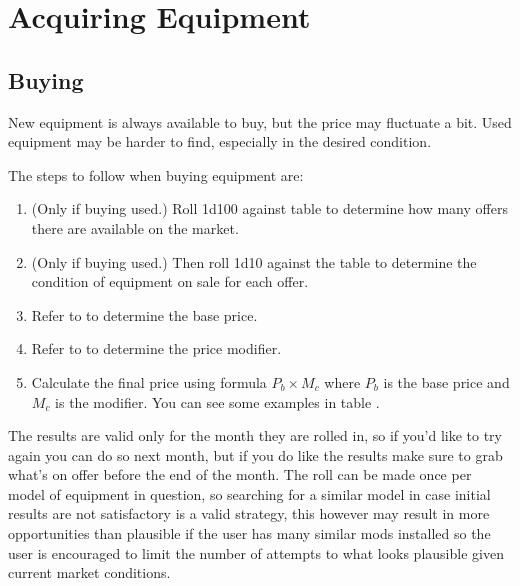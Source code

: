 \documentclass[a4paper,10pt]{article}
\begin{document}
\section{Acquiring Equipment}
\subsection{Buying}
New equipment is always available to buy, but the price may fluctuate a bit.
Used equipment may be harder to find, especially in the desired condition.

The steps to follow when buying equipment are:
\begin{enumerate}
\item (Only if buying used.) Roll 1d100 against table
   to determine how many offers there are
  available on the market.
\item (Only if buying used.) Then roll 1d10 against the table
   to determine the condition of
  equipment on sale for each offer.
\item Refer to  to determine the base price.
\item Refer to  to determine the price
  modifier.
\item Calculate the final price using formula $P_b \times M_c$ where $P_b$ is
  the base price and $M_c$ is the modifier. You can see some examples in table
  .
\end{enumerate}

The results are valid only for the month they are rolled in, so if you'd like to
try again you can do so next month, but if you do like the results make sure to
grab what's on offer before the end of the month. The roll can be made once per
model of equipment in question, so searching for a similar model in case initial
results are not satisfactory is a valid strategy, this however may result in
more opportunities than plausible if the user has many similar mods installed so
the user is encouraged to limit the number of attempts to what looks plausible
given current market conditions.

\end{document}
